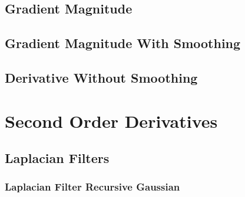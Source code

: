 \subsection{Gradient Magnitude}
\label{sec:GradientMagnitudeImageFilter}

\ifitkFullVersion

\fi

\subsection{Gradient Magnitude With Smoothing}
\label{sec:GradientMagnitudeRecursiveGaussianImageFilter}

\ifitkFullVersion

\fi


\subsection{Derivative Without Smoothing}
\label{sec:DerivativeImageFilter}

\ifitkFullVersion

\fi


\section{Second Order Derivatives}
\label{sec:SecondOrderDerivatives}





\subsection{Laplacian Filters}
\label{sec:LaplacianFilters}

\subsubsection{Laplacian Filter Recursive Gaussian}
\ifitkFullVersion


\fi




